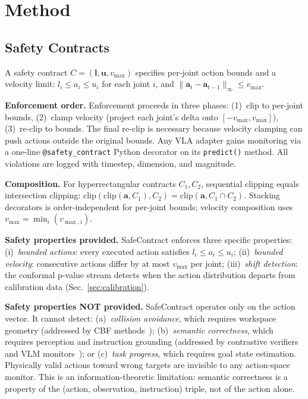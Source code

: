 \documentclass[conference]{IEEEtran}
\begin{document}
\section{Method}

\subsection{Safety Contracts}

A safety contract $C = (\mathbf{l}, \mathbf{u}, v_{\max})$ specifies per-joint action bounds and a velocity limit:
$l_i \leq a_i \leq u_i$ for each joint $i$, and $\|\mathbf{a}_t - \mathbf{a}_{t-1}\|_\infty \leq v_{\max}$.

\textbf{Enforcement order.}
Enforcement proceeds in three phases: (1)~clip to per-joint bounds, (2)~clamp velocity (project each joint's delta onto $[-v_{\max}, v_{\max}]$), (3)~re-clip to bounds.
The final re-clip is necessary because velocity clamping can push actions outside the original bounds.
Any VLA adapter gains monitoring via a one-line \texttt{@safety\_contract} Python decorator on its \texttt{predict()} method.
All violations are logged with timestep, dimension, and magnitude.

\textbf{Composition.}
For hyperrectangular contracts $C_1, C_2$, sequential clipping equals intersection clipping:
$\text{clip}(\text{clip}(\mathbf{a}, C_1), C_2) = \text{clip}(\mathbf{a}, C_1 \cap C_2)$.
Stacking decorators is order-independent for per-joint bounds; velocity composition uses $v_{\max} = \min_i(v_{\max,i})$.

\textbf{Safety properties provided.}
SafeContract enforces three specific properties: (i)~\emph{bounded actions}: every executed action satisfies $l_i \leq a_i \leq u_i$; (ii)~\emph{bounded velocity}: consecutive actions differ by at most $v_{\max}$ per joint; (iii)~\emph{shift detection}: the conformal p-value stream detects when the action distribution departs from calibration data (Sec.~\ref{sec:calibration}).

\textbf{Safety properties NOT provided.}
SafeContract operates only on the action vector.
It cannot detect: (a)~\emph{collision avoidance}, which requires workspace geometry (addressed by CBF methods~\cite{aegis}); (b)~\emph{semantic correctness}, which requires perception and instruction grounding (addressed by contrastive verifiers~\cite{cover2026} and VLM monitors~\cite{sentinel}); or (c)~\emph{task progress}, which requires goal state estimation.
Physically valid actions toward wrong targets are invisible to any action-space monitor.
This is an information-theoretic limitation: semantic correctness is a property of the (action, observation, instruction) triple, not of the action alone.
\end{document}
